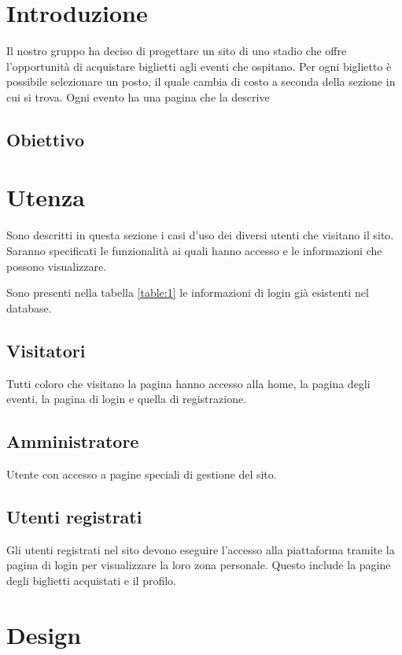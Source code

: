 \documentclass{article}
\begin{document}

\newpage
\tableofcontents
\newpage

\section{Introduzione}
Il nostro gruppo ha deciso di progettare un sito di uno stadio che offre l'opportunità di acquistare biglietti agli eventi che ospitano. Per ogni biglietto è possibile selezionare un posto, il quale cambia di costo a seconda della sezione in cui si trova.
Ogni evento ha una pagina che la descrive
\subsection{Obiettivo}

\section{Utenza}
Sono descritti in questa sezione i casi d'uso dei diversi utenti che visitano il sito. Saranno specificati le funzionalità ai quali hanno accesso e le informazioni che possono visualizzare.
\par
Sono presenti nella tabella \ref{table:1} le informazioni di login già esistenti nel database.

\subsection{Visitatori}
Tutti coloro che visitano la pagina hanno accesso alla home, la pagina degli eventi, la pagina di login e quella di registrazione. 

\subsection{Amministratore}
Utente con accesso a pagine speciali di gestione del sito.

\subsection{Utenti registrati}
Gli utenti registrati nel sito devono eseguire l'accesso alla piattaforma tramite la pagina di login per visualizzare la loro zona personale. Questo include la pagine degli biglietti acquistati e il profilo.

\section{Design}
\end{document}
